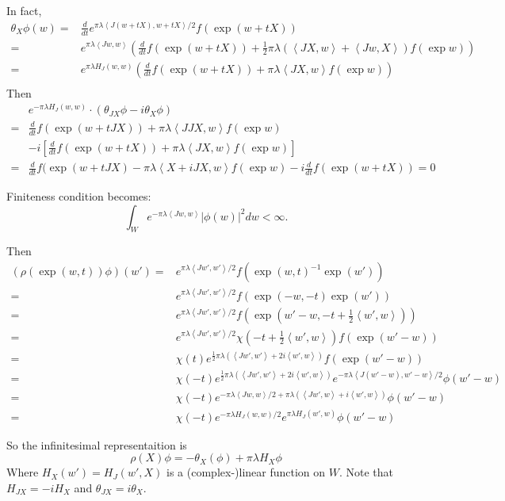 \documentclass[12pt]{amsart}
\def\inn#1#2{\left\langle{#1},{#2}\right\rangle}
\def\abs#1{\left|{#1}\right|}
\def\ddt{\frac{d}{dt}}
\begin{document}
In fact, 
\[
\begin{split}
\theta_X \phi(w) =& \ddt e^{\pi \lambda \inn{J(w+tX)}{w+tX}/2} f(\exp(w+tX))\\
= &  e^{\pi \lambda \inn{Jw}{w}}(\ddt f(\exp(w+tX)) 
+ \frac{1}{2}\pi\lambda (\inn{JX}{w}+\inn{Jw}{X}) f(\exp w )) \\
= &  e^{\pi \lambda H_J(w,w)}(\ddt f(\exp(w+tX)) + \pi\lambda \inn{JX}{w} 
f(\exp w)) \\
\end{split}
\] 
Then 
\[
\begin{split}
& e^{-\pi \lambda H_J(w,w)}\cdot (\theta_{JX}\phi - i\theta_{X}\phi) \\
= & \ddt f(\exp(w+tJX)) + \pi\lambda \inn{JJX}{w} f(\exp w)\\
&-i \left[ \ddt f(\exp(w+tX)) + \pi\lambda \inn{JX}{w} f(\exp w)\right]\\
=& \ddt f(\exp(w+tJX)  - \pi \lambda \inn{X+iJX}{w} f(\exp w)
- i \ddt f(\exp(w+tX))= 0 
\end{split}
\]

Finiteness condition becomes:
\[
\int_W e^{-\pi \lambda \inn{Jw}{w}}\abs{\phi(w)}^2dw < \infty.
\]

Then
\[
\begin{split}
(\rho(\exp(w,t))\phi)(w') 
=& e^{\pi \lambda \inn{Jw'}{w'}/2} f(\exp(w,t)^{-1}\exp(w'))\\
=& e^{\pi \lambda \inn{Jw'}{w'}/2} f(\exp(-w,-t)\exp(w'))\\
=& e^{\pi \lambda \inn{Jw'}{w'}/2} f(\exp(w'-w,-t+\frac{1}{2}\inn{w'}{w}))\\
=& e^{\pi \lambda \inn{Jw'}{w'}/2} \chi(-t+ \frac{1}{2}\inn{w'}{w}) f(\exp(w'-w))\\
=& \chi(t) e^{\frac{1}{2}\pi \lambda (\inn{Jw'}{w'}+2i \inn{w'}{w})}
 f(\exp(w'-w)) \\
=& \chi(-t) e^{\frac{1}{2}\pi \lambda (\inn{Jw'}{w'}+2i \inn{w'}{w})} 
e^{-\pi \lambda \inn{J(w'-w)}{w'-w}/2} \phi(w'-w)\\
=& \chi(-t) e^{-\pi \lambda \inn{Jw}{w}/2+ \pi\lambda (\inn{Jw'}{w}+i\inn{w'}{w})} 
 \phi(w'-w) \\
=& \chi(-t) e^{-\pi\lambda H_J(w,w)/2} e^{\pi\lambda H_J(w',w)} \phi(w'-w)
\end{split}
\]


So the infinitesimal representaition is 
\[
\rho(X) \phi = -\theta_X(\phi) +\pi\lambda H_X \phi
\]
Where $H_X(w') = H_J(w',X)$ is a (complex-)linear function on $W$.
Note that $H_{JX} = -i H_X$ and $\theta_{JX} = i\theta_X$.
\end{document}
